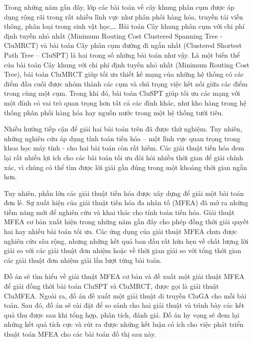 \fontsize{12}{16}\selectfont

Trong những năm gần đây, lớp các bài toán về cây khung phân cụm được áp dụng rộng rãi trong rất nhiều lĩnh vực như phân phối hàng hóa, truyền tải viễn thông, phân loại trong sinh vật học,… Bài toán Cây khung phân cụm với chi phí định tuyến nhỏ nhất (Minimum Routing Cost Clustered Spanning Tree - CluMRCT) và bài toán Cây phân cụm đường đi ngắn nhất (Clustered Shortest Path Tree – CluSPT) là hai trong số những bài toán như vậy. Là một biến thể của bài toán Cây khung với chi phí định tuyến nhỏ nhất (Minimum Routing Cost Tree), bài toán CluMRCT giúp tối ưu thiết kế mạng của những hệ thống có các điểm đầu cuối được nhóm thành các cụm và chú trọng việc kết nối giữa các điểm trong cùng một cụm. Trong khi đó, bài toán CluSPT giúp tối ưu các mạng với một đỉnh có vai trò quan trọng hơn tất cả các đỉnh khác, như kho hàng trong hệ thống phân phối hàng hóa hay nguồn nước trong một hệ thống tưới tiêu.

Nhiều hướng tiếp cận để giải hai bài toán trên đã được thử nghiệm. Tuy nhiên, những nghiên cứu áp dụng tính toán tiến hóa – một lĩnh vực quan trọng trong khoa học máy tính - cho hai bài toán còn rất hiếm. Các giải thuật tiến hóa đem lại rất nhiều lợi ích cho các bài toán tối ưu đòi hỏi nhiều thời gian để giải chính xác, vì chúng có thể tìm được lời giải gần đúng trong một khoảng thời gian ngắn hơn. 

Tuy nhiên, phần lớn các giải thuật tiến hóa được xây dựng để giải một bài toán đơn lẻ. Sự xuất hiện của giải thuật tiến hóa đa nhân tố (MFEA) đã mở ra những tiềm năng mới để nghiên cứu và khai thác cho tính toán tiến hóa. Giải thuật MFEA cơ bản xuất hiện trong những năm gần đây cho phép đồng thời giải quyết hai hay nhiều bài toán tối ưu. Các ứng dụng của giải thuật MFEA chưa được nghiên cứu sâu rộng, nhưng những kết quả ban đầu rất hứa hẹn về chất lượng lời giải so với các giải thuật đơn nhiệm hoặc về thời gian giải so với tổng thời gian các giải thuật đơn nhiệm giải lần lượt từng bài toán. 

Đồ án sẽ tìm hiểu về giải thuật MFEA cơ bản và đề xuất một giải thuật MFEA để giải đồng thời bài toán CluSPT và CluMRCT, được gọi là giải thuật CluMFEA. Ngoài ra, đồ án đề xuất một giải thuật di truyền CluGA cho mỗi bài toán. Sau đó, đồ án sẽ cài đặt để so sánh cho hai giải thuật và trình bày các kết quả thu được sau khi tổng hợp, phân tích, đánh giá. Đồ án hy vọng sẽ đem lại những kết quả tích cực và rút ra được những kết luận có ích cho việc phát triển thuật toán MFEA cho các bài toán đồ thị sau này.
